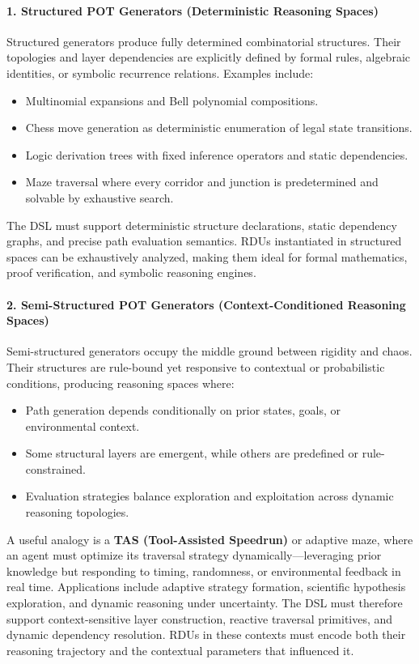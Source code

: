\documentclass[11pt]{article}
\begin{document}
\paragraph{1. Structured POT Generators (Deterministic Reasoning Spaces)}
Structured generators produce fully determined combinatorial structures. Their topologies and layer dependencies are explicitly defined by formal rules, algebraic identities, or symbolic recurrence relations. Examples include:
\begin{itemize}
    \item Multinomial expansions and Bell polynomial compositions.
    \item Chess move generation as deterministic enumeration of legal state transitions.
    \item Logic derivation trees with fixed inference operators and static dependencies.
    \item Maze traversal where every corridor and junction is predetermined and solvable by exhaustive search.
\end{itemize}
The DSL must support deterministic structure declarations, static dependency graphs, and precise path evaluation semantics. RDUs instantiated in structured spaces can be exhaustively analyzed, making them ideal for formal mathematics, proof verification, and symbolic reasoning engines.

\paragraph{2. Semi-Structured POT Generators (Context-Conditioned Reasoning Spaces)}
Semi-structured generators occupy the middle ground between rigidity and chaos. Their structures are rule-bound yet responsive to contextual or probabilistic conditions, producing reasoning spaces where:
\begin{itemize}
    \item Path generation depends conditionally on prior states, goals, or environmental context.
    \item Some structural layers are emergent, while others are predefined or rule-constrained.
    \item Evaluation strategies balance exploration and exploitation across dynamic reasoning topologies.
\end{itemize}
A useful analogy is a \textbf{TAS (Tool-Assisted Speedrun)} or adaptive maze, where an agent must optimize its traversal strategy dynamically—leveraging prior knowledge but responding to timing, randomness, or environmental feedback in real time.  
Applications include adaptive strategy formation, scientific hypothesis exploration, and dynamic reasoning under uncertainty.  
The DSL must therefore support context-sensitive layer construction, reactive traversal primitives, and dynamic dependency resolution. RDUs in these contexts must encode both their reasoning trajectory and the contextual parameters that influenced it.
\end{document}

